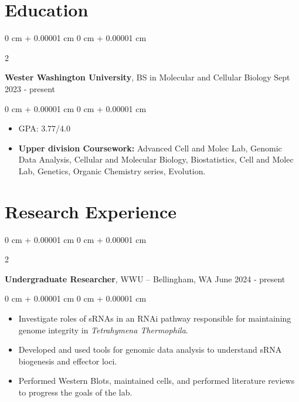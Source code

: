\documentclass[10pt, letterpaper]{article}
\newenvironment{highlights}{
    \begin{itemize}[
        topsep=0.10 cm,
        parsep=0.10 cm,
        partopsep=0pt,
        itemsep=0pt,
        leftmargin=0 cm + 10pt
    ]
}{
    \end{itemize}
} %
\newenvironment{onecolentry}{
    \begin{adjustwidth}{
        0 cm + 0.00001 cm
    }{
        0 cm + 0.00001 cm
    }
}{
    \end{adjustwidth}
} %
\newenvironment{twocolentry}[2][]{
    \onecolentry
    \def\secondColumn{#2}
    \setcolumnwidth{\fill, 4.5 cm}
    \begin{paracol}{2}
}{
    \switchcolumn \raggedleft \secondColumn
    \end{paracol}
    \endonecolentry
} %
\begin{document}
    \section{Education}




        \begin{twocolentry}{
            Sept 2023 - present
        }
            \textbf{Wester Washington University}, BS in Molecular and Cellular Biology \end{twocolentry}

        \vspace{0.10 cm}
        \begin{onecolentry}
            \begin{highlights}
                \item GPA: 3.77/4.0 %
                \item \textbf{Upper division Coursework:} Advanced Cell and Molec Lab, Genomic Data Analysis, Cellular and Molecular Biology, Biostatistics, Cell and Molec Lab, Genetics, Organic Chemistry series, Evolution.
            \end{highlights}
        \end{onecolentry}




    \section{Research Experience}




        \begin{twocolentry}{
            June 2024 - present
        }
            \textbf{Undergraduate Researcher}, WWU -- Bellingham, WA\end{twocolentry}

        \vspace{0.10 cm}
        \begin{onecolentry}
            \begin{highlights}
            \item Investigate roles of sRNAs in an RNAi pathway responsible for maintaining genome integrity in \textit{Tetrahymena Thermophila}.
                \item Developed and used tools for genomic data analysis to understand sRNA biogenesis and effector loci.
                \item Performed Western Blots, maintained cells, and performed literature reviews to progress the goals of the lab.
            \end{highlights}
        \end{onecolentry}
\end{document}
